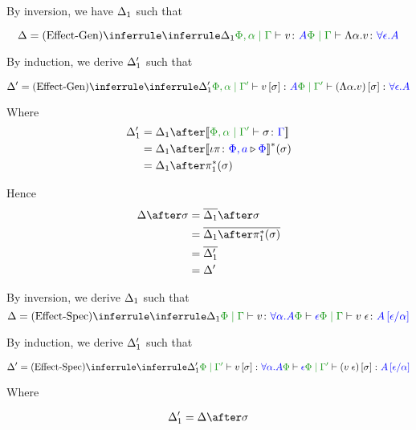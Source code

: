 \documentclass{report}
\begin{document}

By inversion, we have $\Delta_1$ such that

\begin{equation}
    \D = \ntreeruleI{Effect-Gen}{\treeruleI{\D_1}{\etyperelation{\P,\a}{\G}{v}{A}}}{\gpetyperelation{\elam{\a}{v}}{\all{\e}{A}}}
\end{equation}

By induction, we derive $\Delta_1'$ such that

\begin{equation}
    \D' = \ntreeruleI{Effect-Gen}{\treeruleI{\D_1'}{\etyperelation{\P,\a}{\G'}{v\ssi}{A}}}{\etyperelation{\P}{\G'}{(\elam{\a}{v})\ssi}{\all{\e}{A}}}
\end{equation}

Where 
\begin{align*}
    \D_1' & = \D_1\after\deno{\etyperelation{\P,\a}{\G'}{\si}{\G}}\\
    & = \D_1\after\deno{\wrel{\i\pi}{\P,a}{\P}}\star(\si)\\
    & = \D_1\after\pstar(\si)
\end{align*}

Hence \begin{align*}
    \D\after\si & = \bar{\D_1}\after\si\\
    & = \bar{\D_1\after\pstar(\si)}\\
    & = \bar{\D_1'}\\
    & = \D'
\end{align*}

By inversion, we derive $\Delta_1$ such that
\begin{equation}
    \D = \ntreeruleII{Effect-Spec}{\treeruleI{\D_1}{\etyperelation{\P}{\G}{v}{\all{\a}{A}}}}{\wellformed{\P}{\e}}{\etyperelation{\P}{\G}{\eapp{v}{\e}}{A\ssub{\a}{\e}}}
\end{equation}

By induction, we derive $\Delta_1'$ such that

\begin{equation}
    \D' = \ntreeruleII{Effect-Spec}{\treeruleI{\D_1'}{\etyperelation{\P}{\G'}{v\ssi}{\all{\a}{A}}}}{\wellformed{\P}{\e}}{\etyperelation{\P}{\G'}{(\eapp{v}{\e})\ssi}{A\ssub{\a}{\e}}}
\end{equation}

Where 

\begin{align*}
    \D_1' = \D\after\si
\end{align*}
\end{document}
